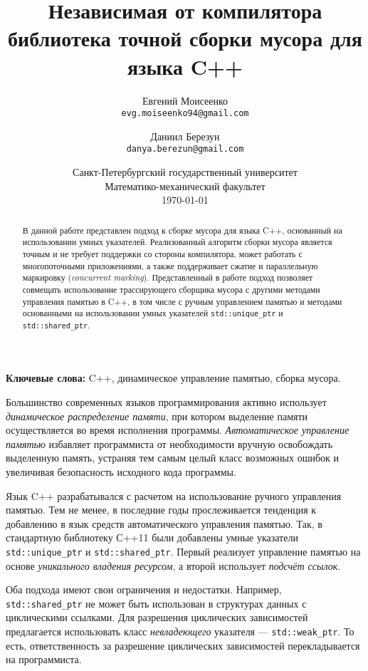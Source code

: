 \documentclass[10pt]{article}
\title{Независимая от компилятора библиотека точной сборки мусора для языка C++}
\author{
        Евгений Моисеенко\\ \texttt{evg.moiseenko94@gmail.com}
            \and
        Даниил Березун\\ \texttt{danya.berezun@gmail.com}
}
\date{
  Санкт-Петербургский государственный университет\\
  Математико-механический факультет\\
  \today
}
\newcommand{\code}{\texttt}
\begin{document}
\maketitle

\begin{abstract}
В данной работе представлен подход к сборке мусора для языка C++, основанный на использовании умных указателей.
Реализованный алгоритм сборки мусора является точным и не требует поддержки со стороны компилятора,
может работать с многопоточными приложениями,
а также поддерживает сжатие и параллельную маркировку (\emph{concurrent marking}).
Представленный в работе подход позволяет совмещать использование 
трассирующего сборщика мусора с другими методами управления памятью в C++, 
в том числе с ручным управлением памятью и методами основанными на использовании
умных указателей \code{std::unique\_ptr} и \code{std::shared\_ptr}. 

\end{abstract}

\textbf{Ключевые слова:} C++, динамическое управление памятью, сборка мусора.

\vspace{5mm}

Большинство современных языков программирования активно использует \emph{динамическое распределение памяти}, 
при котором выделение памяти осуществляется во время исполнения программы. 
\emph{Автоматическое управление памятью} избавляет программиста от необходимости 
вручную освобождать выделенную память, 
устраняя тем самым целый класс возможных ошибок и 
увеличивая безопасность исходного кода программы. 


Язык C++ разрабатывался с расчетом на использование ручного управления памятью.
Тем не менее, в последние годы прослеживается тенденция к добавлению в язык 
средств автоматического управления памятью. 
Так, в стандартную библиотеку С++11 были добавлены 
умные указатели \code{std::unique\_ptr} и \code{std::shared\_ptr}. 
Первый реализует управление памятью на основе \emph{уникального владения ресурсом},
а второй использует \emph{подсчёт ссылок}. 

Оба подхода имеют свои ограничения и недостатки. 
Например, \\\code{std::shared\_ptr} не может быть использован 
в структурах данных с циклическими ссылками.
Для разрешения циклических зависимостей предлагается использовать  
класс \emph{невладеющего} указателя --- \code{std::weak\_ptr}.
То есть, ответственность за разрешение циклических зависимостей 
перекладывается на программиста. 
\end{document}
